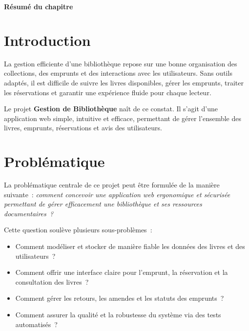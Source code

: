 \documentclass{rapportPFA}
\begin{document}
\begin{center}
    \textbf{Résumé du chapitre}
\end{center}
\begin{center}
\end{center}

\newpage
\setcounter{section}{0}
\renewcommand{\thesection}{1.\arabic{section}}

\section{Introduction}

La gestion efficiente d'une bibliothèque repose sur une bonne organisation des collections,
des emprunts et des interactions avec les utilisateurs.
Sans outils adaptés, il est difficile de suivre les livres disponibles, gérer les emprunts,
traiter les réservations et garantir une expérience fluide pour chaque lecteur.

Le projet \textbf{Gestion de Bibliothèque} naît de ce constat. Il s'agit d'une application web
simple, intuitive et efficace, permettant de gérer l'ensemble des livres, emprunts,
réservations et avis des utilisateurs.

\section{Problématique}

La problématique centrale de ce projet peut être formulée de la manière suivante~:
\textit{comment concevoir une application web ergonomique et sécurisée permettant de
gérer efficacement une bibliothèque et ses ressources documentaires~?}

Cette question soulève plusieurs sous-problèmes~:
\begin{itemize}
    \item Comment modéliser et stocker de manière fiable les données des livres et des utilisateurs~?
    \item Comment offrir une interface claire pour l'emprunt, la réservation et la consultation des livres~?
    \item Comment gérer les retours, les amendes et les statuts des emprunts~?
    \item Comment assurer la qualité et la robustesse du système via des tests automatisés~?
\end{itemize}
\end{document}
